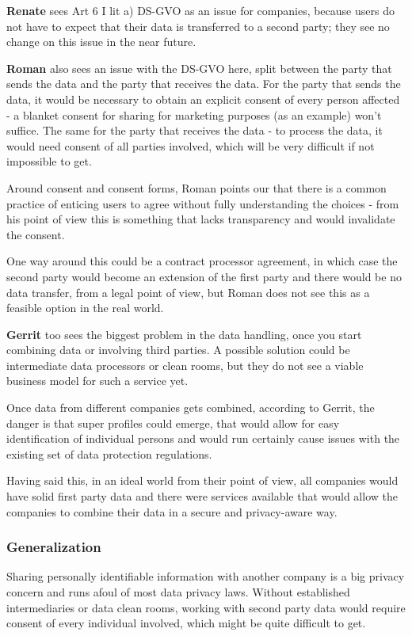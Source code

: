 \textbf{Renate} sees Art 6 I lit a) DS-GVO as an issue for companies, because users do not have to expect that their data is transferred to a second party; they see no change on this issue in the near future.

\textbf{Roman} also sees an issue with the DS-GVO here, split between the party that sends the data and the party that receives the data. For the party that sends the data, it would be necessary to obtain an explicit consent of every person affected - a blanket consent for sharing for marketing purposes (as an example) won't suffice. The same for the party that receives the data - to process the data, it would need consent of all parties involved, which will be very difficult if not impossible to get.

Around consent and consent forms, Roman points our that there is a common practice of enticing users to agree without fully understanding the choices - from his point of view this is something that lacks transparency and would invalidate the consent.

One way around this could be a contract processor agreement, in which case the second party would become an extension of the first party and there would be no data transfer, from a legal point of view, but Roman does not see this as a feasible option in the real world.

\textbf{Gerrit} too sees the biggest problem in the data handling, once you start combining data or involving third parties. A possible solution could be intermediate data processors or clean rooms, but they do not see a viable business model for such a service yet.

Once data from different companies gets combined, according to Gerrit, the danger is that super profiles could emerge, that would allow for easy identification of individual persons and would run certainly cause issues with the existing set of data protection regulations.

Having said this, in an ideal world from their point of view, all companies would have solid first party data and there were services available that would allow the companies to combine their data in a secure and privacy-aware way. 

\subsubsection{Generalization}

Sharing personally identifiable information with another company is a big privacy concern and runs afoul of most data privacy laws. Without established intermediaries or data clean rooms, working with second party data would require consent of every individual involved, which might be quite difficult to get.

